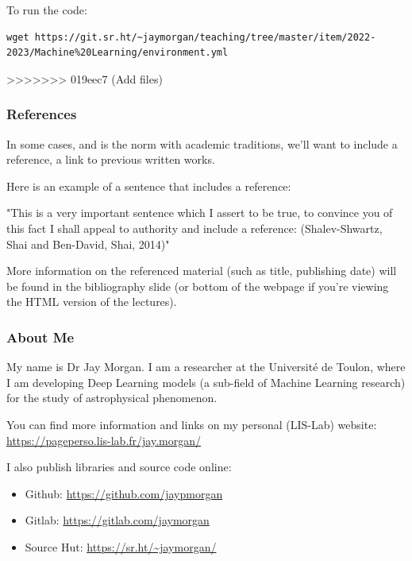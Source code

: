 \documentclass[10pt]{beamer}
\begin{document}
To run the code:

\begin{verbatim}
wget https://git.sr.ht/~jaymorgan/teaching/tree/master/item/2022-2023/Machine%20Learning/environment.yml
\end{verbatim}
>>>>>>> 019eec7 (Add files)

\subsubsection*{References}
\label{sec:org4fcc357}

In some cases, and is the norm with academic traditions, we'll want to include a
reference, a link to previous written works.

Here is an example of a sentence that includes a reference:

"This is a very important sentence which I assert to be true, to convince you of this
fact I shall appeal to authority and include a reference:
(Shalev-Shwartz, Shai and Ben-David, Shai, 2014)"

More information on the referenced material (such as title, publishing date) will be
found in the bibliography slide (or bottom of the webpage if you're viewing the HTML
version of the lectures).

\subsubsection*{About Me}
\label{sec:org6b0d98d}

My name is Dr Jay Morgan. I am a researcher at the Université de Toulon, where I am
developing Deep Learning models (a sub-field of Machine Learning research) for the
study of astrophysical phenomenon.

You can find more information and links on my personal (LIS-Lab) website:
\url{https://pageperso.lis-lab.fr/jay.morgan/}

I also publish libraries and source code online:
\begin{itemize}
\item Github: \url{https://github.com/jaypmorgan}
\item Gitlab: \url{https://gitlab.com/jaymorgan}
\item Source Hut: \url{https://sr.ht/\~jaymorgan/}
\end{itemize}
\end{document}
